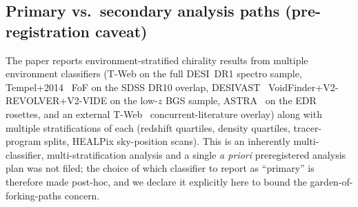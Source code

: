 \documentclass[aps,prd,twocolumn,superscriptaddress,showpacs,preprintnumbers,nofootinbib,longbibliography,floatfix]{revtex4-2}
\begin{document}
\subsection{Primary vs.\ secondary analysis paths (pre-registration
caveat)}\label{sec:primary_path}

The paper reports environment-stratified chirality results from
multiple environment classifiers (T-Web on the full DESI~DR1 spectro
sample, Tempel+2014~\cite{Tempel2014} FoF on the SDSS DR10 overlap,
DESIVAST~\cite{DESIVAST2025} VoidFinder+V2-REVOLVER+V2-VIDE on the
low-$z$ BGS sample, ASTRA~\cite{ASTRADESI2026} on the EDR rosettes,
and an external T-Web~\cite{TWebDESI2026} concurrent-literature
overlay) along with multiple stratifications of each
(redshift quartiles, density quartiles, tracer-program splits,
HEALPix sky-position scans). This is an inherently multi-classifier,
multi-stratification analysis and a single \emph{a priori} preregistered
analysis plan was not filed; the choice of which classifier to
report as ``primary'' is therefore made post-hoc, and we declare it
explicitly here to bound the garden-of-forking-paths concern.
\end{document}
